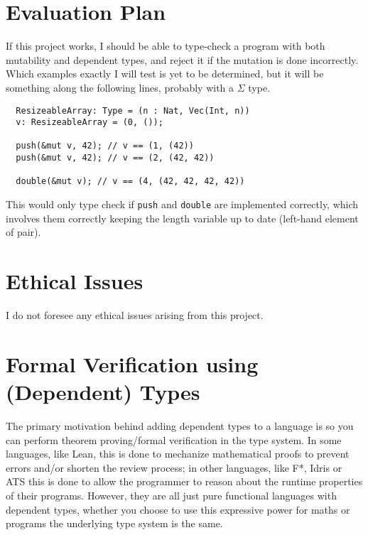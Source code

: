 \documentclass[12pt,twoside]{report}
\begin{document}
\chapter{Evaluation Plan}
If this project works, I should be able to type-check a program with both mutability and dependent types, and reject it if the mutation is done incorrectly. Which examples exactly I will test is yet to be determined, but it will be something along the following lines, probably with a $\Sigma$ type.

\begin{lstlisting}
  ResizeableArray: Type = (n : Nat, Vec(Int, n))
  v: ResizeableArray = (0, ());

  push(&mut v, 42); // v == (1, (42))
  push(&mut v, 42); // v == (2, (42, 42))

  double(&mut v); // v == (4, (42, 42, 42, 42))
\end{lstlisting}

This would only type check if \verb|push| and \verb|double| are implemented correctly, which involves them correctly keeping the length variable up to date (left-hand element of pair).

\chapter{Ethical Issues}
I do not foresee any ethical issues arising from this project.




\appendix 
{}

\chapter{Formal Verification using (Dependent) Types}
\label{verificationwithtypes}

The primary motivation behind adding dependent types to a language is so you can perform theorem proving/formal verification in the type system. In some languages, like Lean, this is done to mechanize mathematical proofs to prevent errors and/or shorten the review process; in other languages, like F*, Idris or ATS this is done to allow the programmer to reason about the runtime properties of their programs. However, they are all just pure functional languages with dependent types, whether you choose to use this expressive power for maths or programs the underlying type system is the same.
\end{document}
